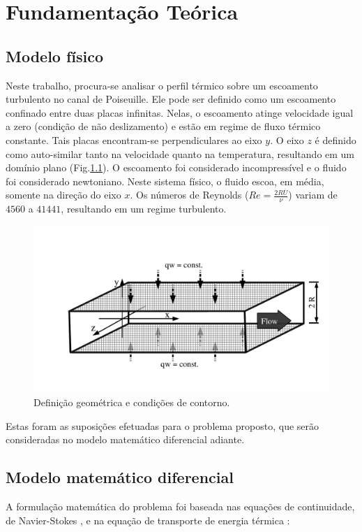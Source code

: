 \chapter[Fundamentação Teórica]{Fundamentação Teórica}


\section{Modelo físico}

Neste trabalho, procura-se analisar o perfil térmico sobre um escoamento turbulento no canal de Poiseuille. Ele pode ser definido como um escoamento confinado entre duas placas infinitas. Nelas, o escoamento atinge velocidade igual a zero (condição de não deslizamento) e estão em regime de fluxo térmico constante. Tais placas encontram-se perpendiculares ao eixo $y$. O eixo $z$ é definido como auto-similar tanto na velocidade quanto na temperatura, resultando em um domínio plano (Fig.\ref{descricaoGeometrica}). O escoamento foi considerado incompressível e o fluido foi considerado newtoniano. Neste sistema físico, o fluido escoa, em média, somente na direção do eixo $x$.
Os números de Reynolds ($Re = \frac{2R \overline{U}}{\nu}$) variam de $4560$ a $41441$, resultando em um regime turbulento.

\begin{figure}[h!]
	\centering
	\includegraphics[angle=0, trim={0mm 23mm 0mm 35mm}, clip , scale=0.42]{cap_fundamentacao/canal1.pdf}
	\caption{Definição geométrica e condições de contorno.}
	\label{descricaoGeometrica}
\end{figure}

Estas foram as suposições efetuadas para o problema proposto, que serão consideradas no modelo matemático diferencial adiante.

\section{Modelo matemático diferencial}
A formulação matemática do problema foi baseada nas equações de continuidade, de Navier-Stokes \cite{Cengel}, e na equação de transporte de energia térmica \cite{Incropera}: 

